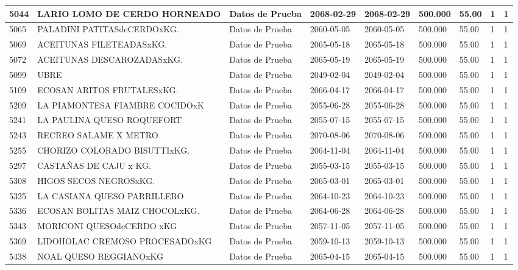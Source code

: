 \documentclass[a4paper,12pt]{article}
\begin{document}
\begin{landscape}
\begin{longtable}{|p{4cm}|p{2.5cm}|p{2.5cm}|p{1.8cm}|p{1.8cm}|p{1cm}|p{1cm}|p{3cm}|p{3cm}||}
5044 & LARIO LOMO DE CERDO HORNEADO & Datos de Prueba & 2068-02-29 & 2068-02-29 & 500.000 & 55.00 & 1 & 1 \\ \hline 
5065 & PALADINI PATITASdeCERDOxKG. & Datos de Prueba & 2060-05-05 & 2060-05-05 & 500.000 & 55.00 & 1 & 1 \\ \hline 
5069 & ACEITUNAS FILETEADASxKG. & Datos de Prueba & 2065-05-18 & 2065-05-18 & 500.000 & 55.00 & 1 & 1 \\ \hline 
5072 & ACEITUNAS DESCAROZADASxKG. & Datos de Prueba & 2065-05-19 & 2065-05-19 & 500.000 & 55.00 & 1 & 1 \\ \hline 
5099 & UBRE & Datos de Prueba & 2049-02-04 & 2049-02-04 & 500.000 & 55.00 & 1 & 1 \\ \hline 
5109 & ECOSAN ARITOS FRUTALESxKG. & Datos de Prueba & 2066-04-17 & 2066-04-17 & 500.000 & 55.00 & 1 & 1 \\ \hline 
5209 & LA PIAMONTESA FIAMBRE COCIDOxK & Datos de Prueba & 2055-06-28 & 2055-06-28 & 500.000 & 55.00 & 1 & 1 \\ \hline 
5241 & LA PAULINA QUESO ROQUEFORT & Datos de Prueba & 2055-07-15 & 2055-07-15 & 500.000 & 55.00 & 1 & 1 \\ \hline 
5243 & RECREO SALAME X METRO & Datos de Prueba & 2070-08-06 & 2070-08-06 & 500.000 & 55.00 & 1 & 1 \\ \hline 
5255 & CHORIZO COLORADO BISUTTIxKG. & Datos de Prueba & 2064-11-04 & 2064-11-04 & 500.000 & 55.00 & 1 & 1 \\ \hline 
5297 & CASTAÑAS DE CAJU x KG. & Datos de Prueba & 2055-03-15 & 2055-03-15 & 500.000 & 55.00 & 1 & 1 \\ \hline 
5308 & HIGOS SECOS NEGROSxKG. & Datos de Prueba & 2065-03-01 & 2065-03-01 & 500.000 & 55.00 & 1 & 1 \\ \hline 
5325 & LA CASIANA QUESO PARRILLERO & Datos de Prueba & 2064-10-23 & 2064-10-23 & 500.000 & 55.00 & 1 & 1 \\ \hline 
5336 & ECOSAN BOLITAS MAIZ CHOCOLxKG. & Datos de Prueba & 2064-06-28 & 2064-06-28 & 500.000 & 55.00 & 1 & 1 \\ \hline 
5343 & MORICONI QUESOdeCERDO xKG & Datos de Prueba & 2057-11-05 & 2057-11-05 & 500.000 & 55.00 & 1 & 1 \\ \hline 
5369 & LIDOHOLAC CREMOSO PROCESADOxKG & Datos de Prueba & 2059-10-13 & 2059-10-13 & 500.000 & 55.00 & 1 & 1 \\ \hline 
5438 & NOAL QUESO REGGIANOxKG & Datos de Prueba & 2065-04-15 & 2065-04-15 & 500.000 & 55.00 & 1 & 1 \\ \hline 

\end{longtable}
\end{landscape}
\end{document}
